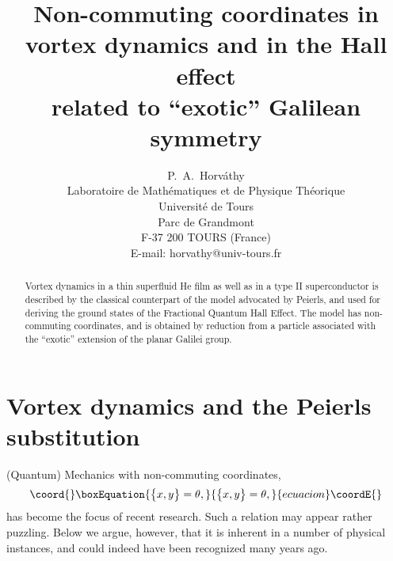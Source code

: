 \documentclass[a4paper,12pt]{article}
\begin{document}

\title{Non-commuting coordinates in
vortex dynamics and in the Hall effect\\
related to ``exotic'' Galilean symmetry}

\author{P.~A.~Horv\'athy
\\
Laboratoire de Math\'ematiques et de Physique Th\'eorique\\
Universit\'e de Tours\\
Parc de Grandmont\\
F-37 200 TOURS (France)\\ 
E-mail: horvathy@univ-tours.fr}  

\maketitle

\begin{abstract}
    Vortex dynamics in a thin superfluid \coordHE{}He film
    as well as in a type II superconductor
    is described by the classical counterpart of
    the model advocated by Peierls, and used for deriving
    the ground states of the Fractional Quantum Hall Effect.
    The model has non-commuting coordinates, and is obtained
    by reduction from a particle associated with the ``exotic''
     extension of the planar Galilei group.
\end{abstract}
    
\section{Vortex dynamics and the Peierls substitution}
                                             
(Quantum) Mechanics with non-commuting coordinates\cite{NC,NC2},
\begin{equation}\coord{}\boxEquation{
\big\{x,y\big\}=\theta,
\label{xycomrel}
}{
\big\{x,y\big\}=\theta,
}{ecuacion}\coordE{}\end{equation}
has become the focus of recent research.
Such a relation may appear rather puzzling. Below we argue,
however, that it is inherent in a number of physical instances,
and could indeed have been recognized many years ago.
\end{document}
